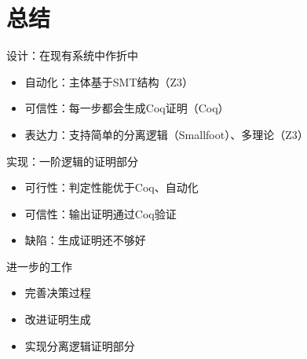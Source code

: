 \documentclass{beamer}
\begin{document}
\section{总结}
\begin{frame}[fragile]
  \begin{block}{设计：在现有系统中作折中}
    \begin{itemize}
      \item 自动化：主体基于SMT结构（Z3）
      \item 可信性：每一步都会生成Coq证明（Coq）
      \item 表达力：支持简单的分离逻辑（Smallfoot）、多理论（Z3）
    \end{itemize}
  \end{block}
\pause
  \begin{block}{实现：一阶逻辑的证明部分}
    \begin{itemize}
    \item 可行性：判定性能优于Coq、自动化
    \item 可信性：输出证明通过Coq验证
    \item 缺陷：生成证明还不够好
    \end{itemize}
  \end{block}
\pause
  \begin{block}{进一步的工作}
    \begin{itemize}
    \item 完善决策过程
    \item 改进证明生成
    \item 实现分离逻辑证明部分
    \end{itemize}
  \end{block}
\end{frame}
\end{document}

